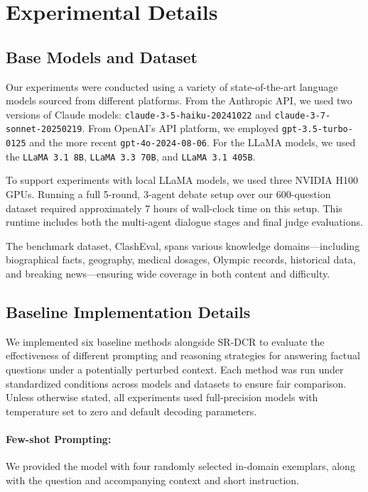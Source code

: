 \documentclass[11pt]{article}
\begin{document}
%


\appendix
\newpage 

\section{Experimental Details}
\label{sec:exp_details}
\subsection{Base Models and Dataset}
Our experiments were conducted using a variety of state-of-the-art language models sourced from different platforms. From the Anthropic API, we used two versions of Claude models: \texttt{claude-3-5-haiku-20241022} and \texttt{claude-3-7-sonnet-20250219}. From OpenAI's API platform, we employed \texttt{gpt-3.5-turbo-0125} and the more recent \texttt{gpt-4o-2024-08-06}. For the LLaMA models, we used the \texttt{LLaMA 3.1 8B}, \texttt{LLaMA 3.3 70B}, and \texttt{LLaMA 3.1 405B}. 

To support experiments with local LLaMA models, we used three NVIDIA H100 GPUs. Running a full 5-round, 3-agent debate setup over our 600-question dataset required approximately 7 hours of wall-clock time on this setup. This runtime includes both the multi-agent dialogue stages and final judge evaluations.

The benchmark dataset, ClashEval, spans various knowledge domains—including biographical facts, geography, medical dosages, Olympic records, historical data, and breaking news—ensuring wide coverage in both content and difficulty.

\subsection{Baseline Implementation Details}
We implemented six baseline methods alongside SR-DCR to evaluate the effectiveness of different prompting and reasoning strategies for answering factual questions under a potentially perturbed context. Each method was run under standardized conditions across models and datasets to ensure fair comparison. Unless otherwise stated, all experiments used full-precision models with temperature set to zero and default decoding parameters.

\paragraph{Few-shot Prompting:} We provided the model with four randomly selected in-domain exemplars, along with the question and accompanying context and short instruction. 
\end{document}
